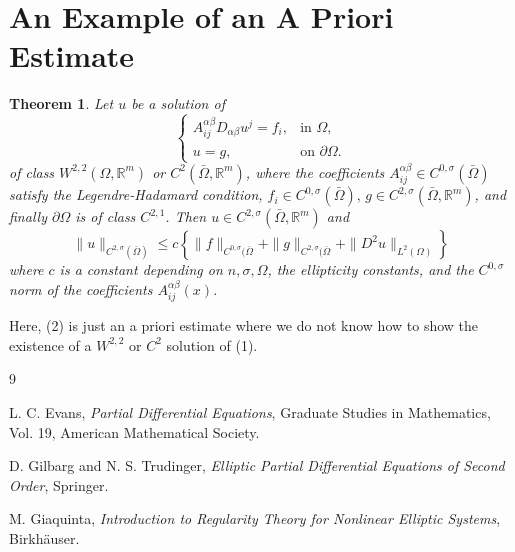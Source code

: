 \documentclass[11pt]{article}
\newtheorem{theorem}{Theorem}
\theoremstyle{definition}
\newcommand{\R}{\mathbb{R}}
\begin{document}
\section{An Example of an A Priori Estimate}
\begin{theorem}
Let $u$ be a solution of
\begin{equation}
\begin{cases}
A_{ij}^{\alpha\beta} D_{\alpha\beta}u^j=f_i, & \text{in } \Omega,\\[0.3em]
u=g, & \text{on } \partial\Omega.
\end{cases}
\end{equation}
of class $W^{2,2}(\Omega, \R^m)$ or $C^2(\bar{\Omega},\R^m)$, where the coefficients $A_{ij}^{\alpha\beta}\in C^{0,\sigma}(\bar{\Omega})$ satisfy the Legendre-Hadamard condition, $f_i\in C^{0,\sigma}(\bar{\Omega}), \, g\in C^{2,\sigma}(\bar{\Omega},\R^m)$, and finally $\partial\Omega$ is of class $C^{2,1}$. Then $u\in C^{2,\sigma}(\bar{\Omega}, \R^m)$ and
\begin{equation}
    \|u\|_{C^{2,\sigma}(\bar{\Omega})}\le c\left\{\|f\|_{C^{0,\sigma}(\bar{\Omega}}+\|g\|_{C^{2,\sigma}(\bar{\Omega}}+\|D^2 u\|_{L^2(\Omega)}\right\}
\end{equation}
where $c$ is a constant depending on $n,\sigma, \Omega$, the ellipticity constants, and the $C^{0,\sigma}$ norm of the coefficients $A_{ij}^{\alpha\beta}(x)$. 
\end{theorem}
Here, (2) is just an a priori estimate where we do not know how to show the existence of a $W^{2,2}$ or $C^2$ solution of (1).


\begin{thebibliography}{9}

L. C. Evans,
\emph{Partial Differential Equations},
Graduate Studies in Mathematics, Vol. 19,
American Mathematical Society.

D. Gilbarg and N. S. Trudinger,
\emph{Elliptic Partial Differential Equations of Second Order},
Springer.

M. Giaquinta,
\emph{Introduction to Regularity Theory for Nonlinear Elliptic Systems},
Birkhäuser.

\end{thebibliography}
\end{document}
